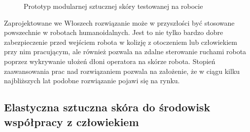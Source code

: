 \begin{figure}[!h]
  \centering
  \caption{Prototyp modularnej sztucznej skóry testowanej na robocie \cite{b_konf_wloch_2_reka}}
  \label{f_triangle_test}
\end{figure}

Zaprojektowane we Włoszech rozwiązanie może w przyszłości być stosowane powszechnie w robotach humanoidalnych. Jest to nie tylko bardzo dobre zabezpieczenie przed wejściem robota w kolizję z otoczeniem lub człowiekiem przy nim pracującym, ale również pozwala na zdalne sterowanie ruchami robota poprzez wykrywanie ułożeń dłoni operatora na skórze robota. Stopień zaawansowania prac nad rozwiązaniem pozwala na założenie, że w ciągu kilku najbliższych lat podobne rozwiązanie pojawi się na rynku. 







\subsection{Elastyczna sztuczna skóra do środowisk współpracy z człowiekiem}

